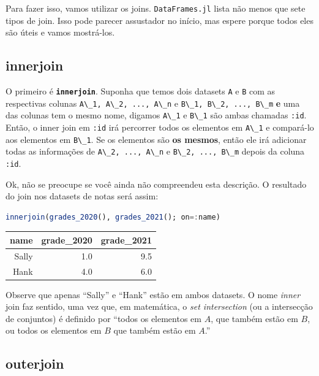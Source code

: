 \documentclass[
  notoc %
]{tufte-book}
\newcommand{\passthrough}[1]{#1}
\begin{document}
Para fazer isso, vamos utilizar os joins.
\passthrough{\lstinline!DataFrames.jl!} lista não menos que sete tipos
de join. Isso pode parecer assustador no início, mas espere porque todos
eles são úteis e vamos mostrá-los.

\hypertarget{sec:innerjoin}{%
\subsection{innerjoin}\label{sec:innerjoin}}

O primeiro é \textbf{\passthrough{\lstinline!innerjoin!}}. Suponha que
temos dois datasets \passthrough{\lstinline!A!} e
\passthrough{\lstinline!B!} com as respectivas colunas
\passthrough{\lstinline!A\_1, A\_2, ..., A\_n!} e
\passthrough{\lstinline!B\_1, B\_2, ..., B\_m!} \textbf{e} uma das
colunas tem o mesmo nome, digamos \passthrough{\lstinline!A\_1!} e
\passthrough{\lstinline!B\_1!} são ambas chamadas
\passthrough{\lstinline!:id!}. Então, o inner join em
\passthrough{\lstinline!:id!} irá percorrer todos os elementos em
\passthrough{\lstinline!A\_1!} e compará-lo aos elementos em
\passthrough{\lstinline!B\_1!}. Se os elementos são \textbf{os mesmos},
então ele irá adicionar todas as informações de
\passthrough{\lstinline!A\_2, ..., A\_n!} e
\passthrough{\lstinline!B\_2, ..., B\_m!} depois da coluna
\passthrough{\lstinline!:id!}.

Ok, não se preocupe se você ainda não compreendeu esta descrição. O
resultado do join nos datasets de notas será assim:

\begin{lstlisting}[language=Julia]
innerjoin(grades_2020(), grades_2021(); on=:name)
\end{lstlisting}

\begin{longtable}[]{@{}rrr@{}}
\toprule
name & grade\_2020 & grade\_2021 \\
\midrule
\endhead
Sally & 1.0 & 9.5 \\
Hank & 4.0 & 6.0 \\
\bottomrule
\end{longtable}

Observe que apenas ``Sally'' e ``Hank'' estão em ambos datasets. O nome
\emph{inner} join faz sentido, uma vez que, em matemática, o \emph{set
intersection} (ou a intersecção de conjuntos) é definido por ``todos os
elementos em \(A\), que também estão em \(B\), ou todos os elementos em
\(B\) que também estão em \(A\).''

\hypertarget{sec:outerjoin}{%
\subsection{outerjoin}\label{sec:outerjoin}}
\end{document}
